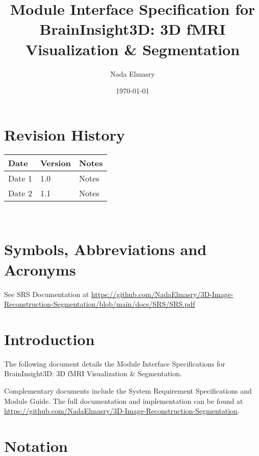 \documentclass[12pt, titlepage]{article}
\begin{document}
\title{Module Interface Specification for BrainInsight3D: 3D fMRI
  Visualization \& Segmentation}

\author{Nada Elmasry}

\date{\today}

\maketitle


\section{Revision History}

\begin{tabularx}{\textwidth}{p{3cm}p{2cm}X}
  \toprule {\bf Date} & {\bf Version} & {\bf Notes} \\
  \midrule
  Date 1              & 1.0           & Notes       \\
  Date 2              & 1.1           & Notes       \\
  \bottomrule
\end{tabularx}

~\newpage

\section{Symbols, Abbreviations and Acronyms}

See SRS Documentation at \url{https://github.com/NadaElmasry/3D-Image-Reconstruction-Segmentation/blob/main/docs/SRS/SRS.pdf}


\newpage

\tableofcontents

\newpage


\section{Introduction}

The following document details the Module Interface Specifications for BrainInsight3D: 3D fMRI
Visualization \& Segmentation.


Complementary documents include the System Requirement Specifications
and Module Guide.  The full documentation and implementation can be
found at \url{https://github.com/NadaElmasry/3D-Image-Reconstruction-Segmentation}.

\section{Notation}
\end{document}
